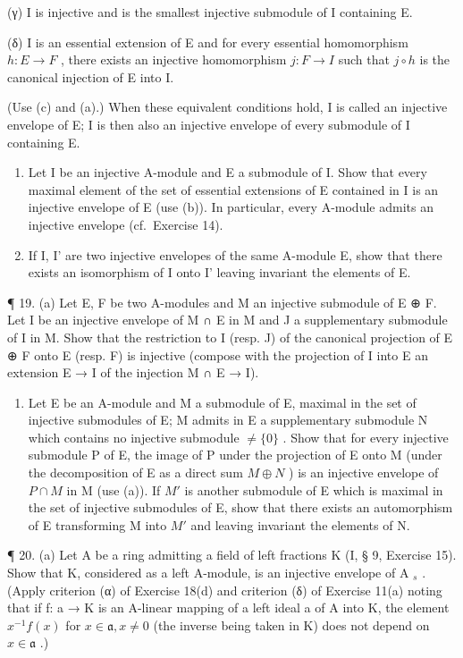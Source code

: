 (γ) I is injective and is the smallest injective submodule of I containing E.

(δ) I is an essential extension of E and for every essential homomorphism \(h: E \to F\) , there exists an injective homomorphism \(j: F \to I\) such that \(j \circ h\) is the canonical injection of E into I.

(Use (c) and (a).) When these equivalent conditions hold, I is called an injective envelope of E; I is then also an injective envelope of every submodule of I containing E.

\begin{enumerate}
\def\labelenumi{(\alph{enumi})}
\setcounter{enumi}{4}
\item
  Let I be an injective A-module and E a submodule of I. Show that every maximal element of the set of essential extensions of E contained in I is an injective envelope of E (use (b)). In particular, every A-module admits an injective envelope (cf.~Exercise 14).
\item
  If I, I' are two injective envelopes of the same A-module E, show that there exists an isomorphism of I onto I' leaving invariant the elements of E.
\end{enumerate}

¶ 19. (a) Let E, F be two A-modules and M an injective submodule of E ⊕ F. Let I be an injective envelope of M ∩ E in M and J a supplementary submodule of I in M. Show that the restriction to I (resp. J) of the canonical projection of E ⊕ F onto E (resp. F) is injective (compose with the projection of I into E an extension E → I of the injection M ∩ E → I).

\begin{enumerate}
\def\labelenumi{(\alph{enumi})}
\setcounter{enumi}{1}
\tightlist
\item
  Let E be an A-module and M a submodule of E, maximal in the set of injective submodules of E; M admits in E a supplementary submodule N which contains no injective submodule \(\neq\{0\}\) . Show that for every injective submodule P of E, the image of P under the projection of E onto M (under the decomposition of E as a direct sum \(M \oplus N\) ) is an injective envelope of \(P \cap M\) in M (use (a)). If \(M'\) is another submodule of E which is maximal in the set of injective submodules of E, show that there exists an automorphism of E transforming M into \(M'\) and leaving invariant the elements of N.
\end{enumerate}

¶ 20. (a) Let A be a ring admitting a field of left fractions K (I, § 9, Exercise 15). Show that K, considered as a left A-module, is an injective envelope of A \(_{s}\) . (Apply criterion (α) of Exercise 18(d) and criterion (δ) of Exercise 11(a) noting that if f: a → K is an A-linear mapping of a left ideal a of A into K, the element \(x^{-1}f(x)\) for \(x \in \mathfrak{a}, x \neq 0\) (the inverse being taken in K) does not depend on \(x \in \mathfrak{a}\) .)

